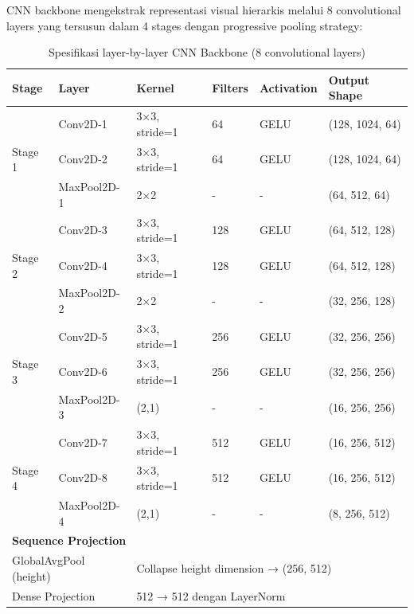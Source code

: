 \documentclass[12pt,a4paper]{article}
\begin{document}
CNN backbone mengekstrak representasi visual hierarkis melalui 8 convolutional layers yang tersusun dalam 4 stages dengan progressive pooling strategy:

\begin{table}[H]
\centering
\caption{Spesifikasi layer-by-layer CNN Backbone (8 convolutional layers)}
\label{tab:recognizer-cnn-detailed}
\scriptsize
\begin{tabular}{|l|l|l|l|l|l|}
\hline
\textbf{Stage} & \textbf{Layer} & \textbf{Kernel} & \textbf{Filters} & \textbf{Activation} & \textbf{Output Shape} \\
\hline
\multirow{3}{*}{Stage 1} & Conv2D-1 & 3×3, stride=1 & 64 & GELU & (128, 1024, 64) \\
\cline{2-6}
 & Conv2D-2 & 3×3, stride=1 & 64 & GELU & (128, 1024, 64) \\
\cline{2-6}
 & MaxPool2D-1 & 2×2 & - & - & (64, 512, 64) \\
\hline
\multirow{3}{*}{Stage 2} & Conv2D-3 & 3×3, stride=1 & 128 & GELU & (64, 512, 128) \\
\cline{2-6}
 & Conv2D-4 & 3×3, stride=1 & 128 & GELU & (64, 512, 128) \\
\cline{2-6}
 & MaxPool2D-2 & 2×2 & - & - & (32, 256, 128) \\
\hline
\multirow{3}{*}{Stage 3} & Conv2D-5 & 3×3, stride=1 & 256 & GELU & (32, 256, 256) \\
\cline{2-6}
 & Conv2D-6 & 3×3, stride=1 & 256 & GELU & (32, 256, 256) \\
\cline{2-6}
 & MaxPool2D-3 & (2,1) & - & - & (16, 256, 256) \\
\hline
\multirow{3}{*}{Stage 4} & Conv2D-7 & 3×3, stride=1 & 512 & GELU & (16, 256, 512) \\
\cline{2-6}
 & Conv2D-8 & 3×3, stride=1 & 512 & GELU & (16, 256, 512) \\
\cline{2-6}
 & MaxPool2D-4 & (2,1) & - & - & (8, 256, 512) \\
\hline
\multicolumn{6}{|l|}{\textbf{Sequence Projection}} \\
\hline
\multicolumn{2}{|l|}{GlobalAvgPool (height)} & \multicolumn{4}{l|}{Collapse height dimension → (256, 512)} \\
\hline
\multicolumn{2}{|l|}{Dense Projection} & \multicolumn{4}{l|}{512 → 512 dengan LayerNorm} \\
\hline
\end{tabular}
\end{table}
\end{document}
